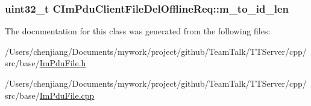 \subsubsection[{m\+\_\+to\+\_\+id\+\_\+len}]{\setlength{\rightskip}{0pt plus 5cm}uint32\+\_\+t C\+Im\+Pdu\+Client\+File\+Del\+Offline\+Req\+::m\+\_\+to\+\_\+id\+\_\+len\hspace{0.3cm}{\ttfamily [private]}}\label{class_c_im_pdu_client_file_del_offline_req_aa98ffa6d48542448c0558fac34cbc832}


The documentation for this class was generated from the following files\+:\begin{DoxyCompactItemize}
\item 
/\+Users/chenjiang/\+Documents/mywork/project/github/\+Team\+Talk/\+T\+T\+Server/cpp/src/base/\hyperlink{_im_pdu_file_8h}{Im\+Pdu\+File.\+h}\item 
/\+Users/chenjiang/\+Documents/mywork/project/github/\+Team\+Talk/\+T\+T\+Server/cpp/src/base/\hyperlink{_im_pdu_file_8cpp}{Im\+Pdu\+File.\+cpp}\end{DoxyCompactItemize}
